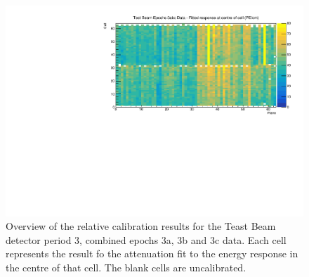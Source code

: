\documentclass[12pt,a4paper]{article}
\begin{document}
\begin{figure}[!hbtp]
\centering
\includegraphics[width=\textwidth]{Plots/CellResponseAtCentre_epoch3abc_Limited.pdf}
\caption{Overview of the relative calibration results for the Teast Beam detector period 3, combined epochs 3a, 3b and 3c data. Each cell represents the result fo the attenuation fit to the energy response in the centre of that cell. The blank cells are uncalibrated.}
\label{figCellCentreResponseEp3abc}
\end{figure}
\end{document}
